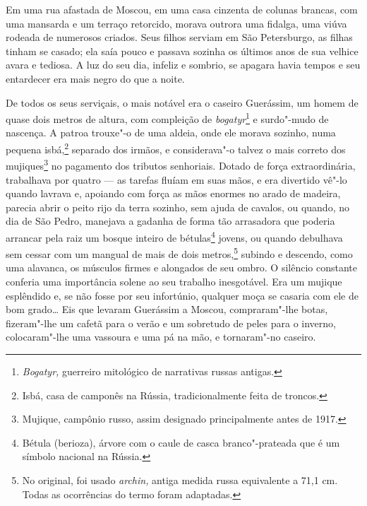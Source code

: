 Em uma rua afastada de Moscou, em uma casa cinzenta de colunas brancas,
com uma mansarda e um terraço retorcido, morava outrora uma fidalga, uma
viúva rodeada de numerosos criados. Seus filhos serviam em São
Petersburgo, as filhas tinham se casado; ela saía pouco e passava
sozinha os últimos anos de sua velhice avara e tediosa. A luz do seu
dia, infeliz e sombrio, se apagara havia tempos e seu entardecer era
mais negro do que a noite.

De todos os seus serviçais, o mais notável era o caseiro Guerássim, um
homem de quase dois metros de altura, com compleição de
\emph{bogatyr}\footnote{\emph{Bogatyr,} guerreiro mitológico de
  narrativas russas antigas.} e surdo"-mudo de nascença. A patroa
trouxe"-o de uma aldeia, onde ele morava sozinho, numa pequena
isbá,\footnote{Isbá, casa de camponês na Rússia, tradicionalmente
  feita de troncos.} separado dos irmãos, e considerava"-o talvez o mais
correto dos mujiques\footnote{Mujique, campônio russo, assim designado
  principalmente antes de 1917.} no pagamento dos tributos senhoriais.
Dotado de força extraordinária, trabalhava por quatro --- as tarefas
fluíam em suas mãos, e era divertido vê"-lo quando lavrava e, apoiando
com força as mãos enormes no arado de madeira, parecia abrir o peito
rijo da terra sozinho, sem ajuda de cavalos, ou quando, no dia de São
Pedro, manejava a gadanha de forma tão arrasadora que poderia arrancar
pela raiz um bosque inteiro de bétulas\footnote{Bétula (berioza), árvore
  com o caule de casca branco"-prateada que é um símbolo nacional na
  Rússia.} jovens, ou quando debulhava sem cessar com um mangual de mais
de dois metros,\footnote{No original, foi usado \emph{archin,} antiga
  medida russa equivalente a 71,1 cm. Todas as ocorrências do termo
  foram adaptadas.} subindo e descendo, como uma alavanca, os músculos
firmes e alongados de seu ombro. O silêncio constante conferia uma
importância solene ao seu trabalho inesgotável. Era um mujique esplêndido
e, se não fosse por seu infortúnio, qualquer moça se casaria com ele de
bom grado\ldots{} Eis que levaram Guerássim a Moscou, compraram"-lhe botas,
fizeram"-lhe um cafetã para o verão e um sobretudo de peles para o
inverno, colocaram"-lhe uma vassoura e uma pá na mão, e tornaram"-no
caseiro.

